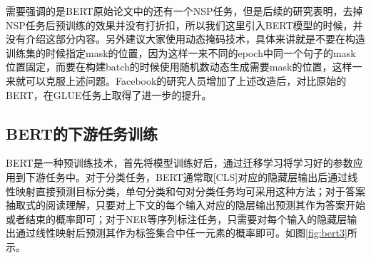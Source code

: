 \documentclass[twoside,a4paper,12pt]{book}%
\begin{document}
需要强调的是\gls{BERT}原始论文中的还有一个NSP任务，但是后续的研究表明，去掉NSP任务后预训练的效果并没有打折扣，所以我们这里引入\gls{BERT}模型的时候，并没有介绍这部分内容。另外建议大家使用动态掩码技术，具体来讲就是不要在构造训练集的时候指定mask的位置，因为这样一来不同的epoch中同一个句子的mask位置固定，而要在构建batch的时候使用随机数动态生成需要mask的位置，这样一来就可以克服上述问题。Facebook的研究人员增加了上述改造后，对比原始的\gls{BERT}，在GLUE任务上取得了进一步的提升。
\subsection{BERT的下游任务训练}
\gls{BERT}是一种预训练技术，首先将模型训练好后，通过迁移学习将学习好的参数应用到下游任务中。对于分类任务，\gls{BERT}通常取[CLS]对应的隐藏层输出后通过线性映射直接预测目标分类，单句分类和句对分类任务均可采用这种方法；对于答案抽取式的阅读理解，只要对上下文的每个输入对应的隐层输出预测其作为答案开始或者结束的概率即可；对于\gls{NER}等序列标注任务，只需要对每个输入的隐藏层输出通过线性映射后预测其作为标签集合中任一元素的概率即可。如图\ref{fig:bert3}所示。
\end{document}
